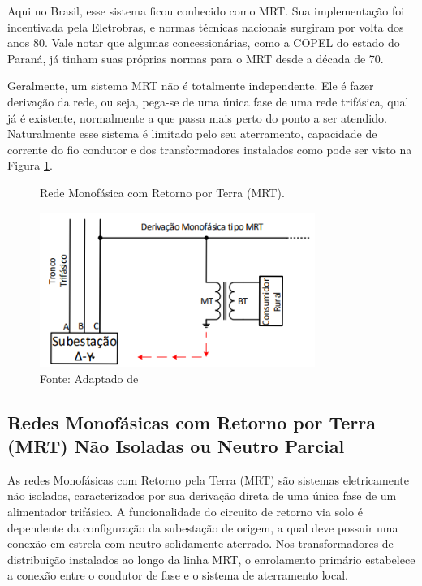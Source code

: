 \documentclass[oneside,openright,12pt]{ufsm_2021} %
\begin{document}
\par Aqui no Brasil, esse sistema ficou conhecido como MRT. Sua implementação foi incentivada pela Eletrobras, e normas técnicas nacionais surgiram por volta dos anos 80. Vale notar que algumas concessionárias, como a COPEL do estado do Paraná, já tinham suas próprias normas para o MRT desde a década de 70.

\par Geralmente, um sistema MRT não é totalmente independente. Ele é fazer derivação da rede, ou seja, pega-se de uma única fase de uma rede trifásica, qual já é existente, normalmente a que passa mais perto do ponto a ser atendido. Naturalmente esse sistema é limitado pelo seu aterramento, capacidade de corrente do fio condutor e dos transformadores instalados como pode ser visto na Figura \ref{fig:RedeMonofasicaComRetornoPorTerraAdptadoFandi2013}.

\begin{figure}[H]
	\centering
	\caption{Rede Monofásica com Retorno por Terra (MRT).}
	\includegraphics[width=0.8\textwidth]{figuras/Imagem1Fandi2013.png}
	\caption*{Fonte: Adaptado de \cite{fandi_sistema_2013}}
	\label{fig:RedeMonofasicaComRetornoPorTerraAdptadoFandi2013}
\end{figure}

\subsection{Redes Monofásicas com Retorno por Terra (MRT) Não Isoladas ou Neutro Parcial}

\par As redes Monofásicas com Retorno pela Terra (MRT) são sistemas eletricamente não isolados, caracterizados por sua derivação direta de uma única fase de um alimentador trifásico. A funcionalidade do circuito de retorno via solo é dependente da configuração da subestação de origem, a qual deve possuir uma conexão em estrela com neutro solidamente aterrado. Nos transformadores de distribuição instalados ao longo da linha MRT, o enrolamento primário estabelece a conexão entre o condutor de fase e o sistema de aterramento local.
\end{document}
